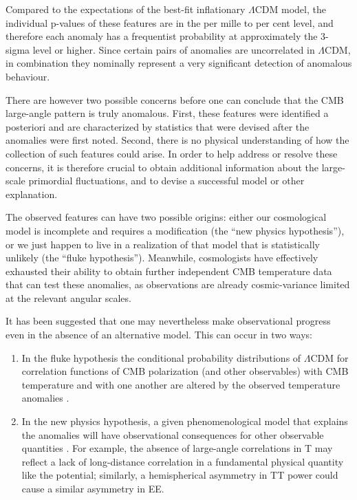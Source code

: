 Compared to the expectations of the best-fit inflationary $\Lambda$CDM model, the individual p-values of these features are in the per mille to per cent level, and therefore each anomaly has a frequentist probability at approximately the 3-sigma level or higher.  Since certain pairs of anomalies are uncorrelated in $\Lambda$CDM, in combination they nominally represent a very significant detection of anomalous behaviour. 

There are however two possible concerns before one can conclude that the CMB large-angle pattern is truly anomalous. First, these features were identified a posteriori and are characterized by statistics that were devised after the anomalies were first noted. Second, there is no physical understanding of how the collection of such features could arise. In order to help address or resolve these concerns, it is therefore crucial to obtain additional information about the large-scale primordial fluctuations, and to devise a successful model or other explanation.

The observed features can have two possible origins: either our cosmological model is incomplete and requires a modification (the ``new physics hypothesis''), or we just happen to live in a realization of that model that is statistically unlikely (the ``fluke hypothesis'').   Meanwhile, cosmologists have effectively exhausted their ability to obtain further independent CMB temperature data that can test these anomalies, as observations are already cosmic-variance limited at the relevant angular scales.

It has been suggested that one may nevertheless make observational progress even in the absence of an alternative model.  This can occur in two ways:
\begin{enumerate}
  \item In the fluke hypothesis the conditional probability distributions of $\Lambda$CDM for correlation functions of CMB polarization
  (and other observables) with CMB temperature and with one another are altered by the observed temperature anomalies  
  \cite{Dvorkin:2007jp, Copi:2013zja, Yoho:2013tta}.
  \item In the new physics hypothesis, a given phenomenological model that explains the anomalies will have observational consequences
  for other observable quantities \cite{Yoho:2015bla}. For example, the absence of large-angle correlations in T may reflect a lack of
  long-distance correlation in a fundamental physical quantity like the potential; similarly, 
  a hemispherical asymmetry in TT power could cause a similar asymmetry in EE.
\end{enumerate}

